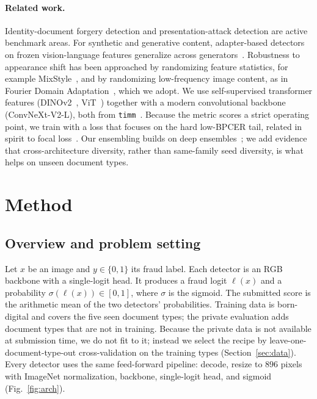 \documentclass[11pt,a4paper]{article}
\begin{document}
\paragraph{Related work.}
Identity-document forgery detection and presentation-attack detection are active benchmark areas. For
synthetic and generative content, adapter-based detectors on frozen vision-language features generalize
across generators~\cite{fatformer}. Robustness to appearance shift has been approached by randomizing
feature statistics, for example MixStyle~\cite{mixstyle}, and by randomizing low-frequency image content, as
in Fourier Domain Adaptation~\cite{fda}, which we adopt. We use self-supervised transformer features
(DINOv2~\cite{dinov2}, ViT~\cite{vit}) together with a modern convolutional backbone (ConvNeXt-V2-L), both
from \texttt{timm}~\cite{timm}. Because the metric scores a strict operating point, we train with a loss that
focuses on the hard low-BPCER tail, related in spirit to focal loss~\cite{focal}. Our ensembling builds on
deep ensembles~\cite{deepensembles}; we add evidence that cross-architecture diversity, rather than
same-family seed diversity, is what helps on unseen document types.

\section{Method}
\label{sec:method}

\subsection{Overview and problem setting}
\label{sec:setting}
Let $x$ be an image and $y\in\{0,1\}$ its fraud label. Each detector is an RGB backbone with a single-logit
head. It produces a fraud logit $\ell(x)$ and a probability $\sigma(\ell(x))\in[0,1]$, where $\sigma$ is the
sigmoid. The submitted score is the arithmetic mean of the two detectors' probabilities. Training data is
born-digital and covers the five seen document types; the private evaluation adds document types that are not
in training. Because the private data is not available at submission time, we do not fit to it; instead we
select the recipe by leave-one-document-type-out cross-validation on the training types
(Section~\ref{sec:data}). Every detector uses the same feed-forward pipeline: decode, resize to $896$ pixels
with ImageNet normalization, backbone, single-logit head, and sigmoid (Fig.~\ref{fig:arch}).
\end{document}
